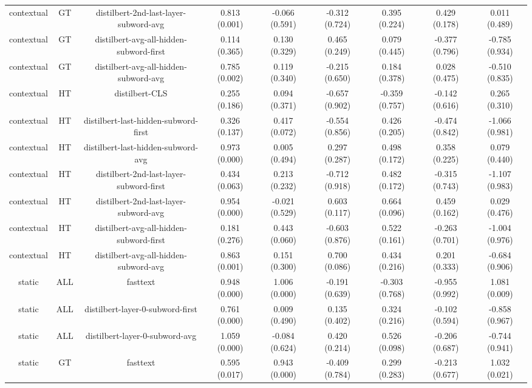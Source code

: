\begin{sidewaystable}[htb]
\begin{tabular}{@{}ccccccccc@{}}
        contextual & GT & distilbert-2nd-last-layer-subword-avg & 0.813 (0.001) & -0.066 (0.591) & -0.312 (0.724) & 0.395 (0.224) & 0.429 (0.178) & 0.011 (0.489) \\
        contextual & GT & distilbert-avg-all-hidden-subword-first & 0.114 (0.365) & 0.130 (0.329) & 0.465 (0.249) & 0.079 (0.445) & -0.377 (0.796) & -0.785 (0.934) \\
        contextual & GT & distilbert-avg-all-hidden-subword-avg & 0.785 (0.002) & 0.119 (0.340) & -0.215 (0.650) & 0.184 (0.378) & 0.028 (0.475) & -0.510 (0.835) \\
        contextual & HT & distilbert-CLS & 0.255 (0.186) & 0.094 (0.371) & -0.657 (0.902) & -0.359 (0.757) & -0.142 (0.616) & 0.265 (0.310) \\
        contextual & HT & distilbert-last-hidden-subword-first & 0.326 (0.137) & 0.417 (0.072) & -0.554 (0.856) & 0.426 (0.205) & -0.474 (0.842) & -1.066 (0.981) \\
        contextual & HT & distilbert-last-hidden-subword-avg & 0.973 (0.000) & 0.005 (0.494) & 0.297 (0.287) & 0.498 (0.172) & 0.358 (0.225) & 0.079 (0.440) \\
        contextual & HT & distilbert-2nd-last-layer-subword-first & 0.434 (0.063) & 0.213 (0.232) & -0.712 (0.918) & 0.482 (0.172) & -0.315 (0.743) & -1.107 (0.983) \\
        contextual & HT & distilbert-2nd-last-layer-subword-avg & 0.954 (0.000) & -0.021 (0.529) & 0.603 (0.117) & 0.664 (0.096) & 0.459 (0.162) & 0.029 (0.476) \\
        contextual & HT & distilbert-avg-all-hidden-subword-first & 0.181 (0.276) & 0.443 (0.060) & -0.603 (0.876) & 0.522 (0.161) & -0.263 (0.701) & -1.004 (0.976) \\
        contextual & HT & distilbert-avg-all-hidden-subword-avg & 0.863 (0.001) & 0.151 (0.300) & 0.700 (0.086) & 0.434 (0.216) & 0.201 (0.333) & -0.684 (0.906) \\
        static & ALL & fasttext & 0.948 (0.000) & 1.006 (0.000) & -0.191 (0.639) & -0.303 (0.768) & -0.955 (0.992) & 1.081 (0.009) \\
        static & ALL & distilbert-layer-0-subword-first & 0.761 (0.000) & 0.009 (0.490) & 0.135 (0.402) & 0.324 (0.216) & -0.102 (0.594) & -0.858 (0.967) \\
        static & ALL & distilbert-layer-0-subword-avg & 1.059 (0.000) & -0.084 (0.624) & 0.420 (0.214) & 0.526 (0.098) & -0.206 (0.687) & -0.744 (0.941) \\
        static & GT & fasttext & 0.595 (0.017) & 0.943 (0.000) & -0.409 (0.784) & 0.299 (0.283) & -0.213 (0.677) & 1.032 (0.021) \\

\end{tabular}
\end{sidewaystable}
